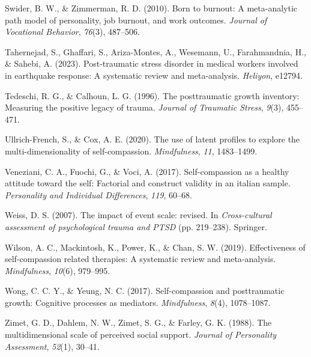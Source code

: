 \documentclass[
  man]{apa6}
\newlength{\cslhangindent}
\newlength{\cslentryspacingunit} %
\newenvironment{CSLReferences}[2] %
 {%
  \setlength{\parindent}{0pt}
  \ifodd #1
  \let\oldpar\par
  \def\par{\hangindent=\cslhangindent\oldpar}
  \fi
  \setlength{\parskip}{#2\cslentryspacingunit}
 }%
 {}
\begin{document}
\begin{CSLReferences}{1}{0}
\leavevmode{}%
Swider, B. W., \& Zimmerman, R. D. (2010). Born to burnout: A meta-analytic path model of personality, job burnout, and work outcomes. \emph{Journal of Vocational Behavior}, \emph{76}(3), 487--506.

\leavevmode{}%
Tahernejad, S., Ghaffari, S., Ariza-Montes, A., Wesemann, U., Farahmandnia, H., \& Sahebi, A. (2023). Post-traumatic stress disorder in medical workers involved in earthquake response: A systematic review and meta-analysis. \emph{Heliyon}, e12794.

\leavevmode{}%
Tedeschi, R. G., \& Calhoun, L. G. (1996). The posttraumatic growth inventory: Measuring the positive legacy of trauma. \emph{Journal of Traumatic Stress}, \emph{9}(3), 455--471.

\leavevmode{}%
Ullrich-French, S., \& Cox, A. E. (2020). The use of latent profiles to explore the multi-dimensionality of self-compassion. \emph{Mindfulness}, \emph{11}, 1483--1499.

\leavevmode{}%
Veneziani, C. A., Fuochi, G., \& Voci, A. (2017). Self-compassion as a healthy attitude toward the self: Factorial and construct validity in an italian sample. \emph{Personality and Individual Differences}, \emph{119}, 60--68.

\leavevmode{}%
Weiss, D. S. (2007). The impact of event scale: revised. In \emph{Cross-cultural assessment of psychological trauma and PTSD} (pp. 219--238). Springer.

\leavevmode{}%
Wilson, A. C., Mackintosh, K., Power, K., \& Chan, S. W. (2019). Effectiveness of self-compassion related therapies: A systematic review and meta-analysis. \emph{Mindfulness}, \emph{10}(6), 979--995.

\leavevmode{}%
Wong, C. C. Y., \& Yeung, N. C. (2017). Self-compassion and posttraumatic growth: Cognitive processes as mediators. \emph{Mindfulness}, \emph{8}(4), 1078--1087.

\leavevmode{}%
Zimet, G. D., Dahlem, N. W., Zimet, S. G., \& Farley, G. K. (1988). The multidimensional scale of perceived social support. \emph{Journal of Personality Assessment}, \emph{52}(1), 30--41.

\end{CSLReferences}
\end{document}
